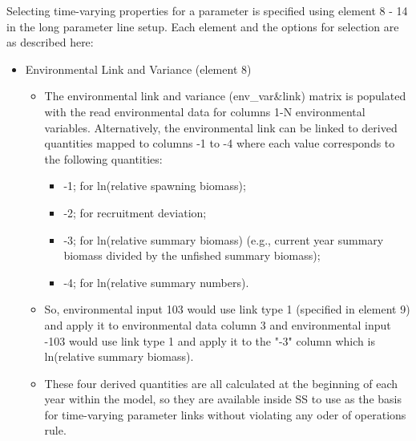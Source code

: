Selecting time-varying properties for a parameter is specified using element 8 - 14 in the long parameter line setup.  Each element and the options for selection are as described here:

\hypertarget{EnvVar}{}
\begin{itemize}

\item Environmental Link and  Variance (element 8)
	\begin{itemize}
		\item The environmental link and variance (env\_var\&link) matrix is populated with the read environmental data for columns 1-N environmental variables. Alternatively, the environmental link can be linked to derived quantities mapped to columns -1 to -4 where each value corresponds to the following quantities:
		\begin{itemize}
			\item -1;  for ln(relative spawning biomass);
			\item -2;  for recruitment deviation;
			\item -3;  for ln(relative summary biomass) (e.g., current year summary biomass divided by the unfished summary biomass);
			\item -4;  for ln(relative summary numbers).
		\end{itemize}
		\item So, environmental input 103 would use link type 1 (specified in element 9) and apply it to environmental data column 3 and environmental input -103  would use link type 1 and apply it to the "-3" column which is ln(relative summary biomass).
		\item These four derived quantities are all calculated at the beginning of each year within the model, so they are available inside SS to use as the basis for time-varying parameter links without violating any oder of operations rule. 
	\end{itemize}
	

\end{itemize}
